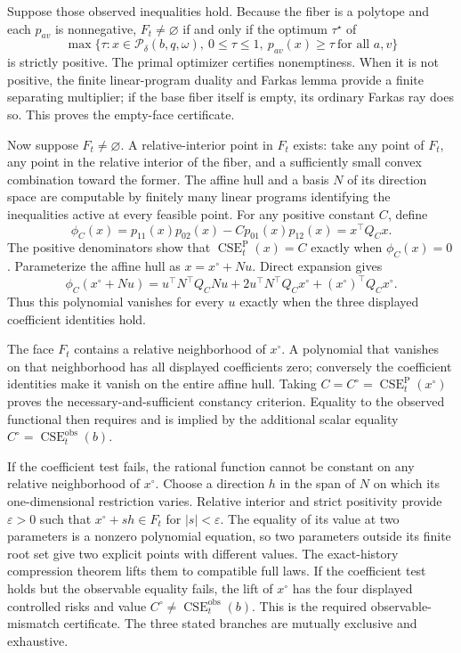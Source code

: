 Suppose those observed inequalities hold.  Because the fiber is a polytope and each \(p_{av}\) is nonnegative, \(F_t\ne\varnothing\) if and only if the optimum \(\tau^\star\) of
\[
\max\{\tau:x\in\mathcal P_\delta(b,q,\omega),\ 0\leq\tau\leq1,
\ p_{av}(x)\geq\tau\ \text{for all }a,v\}
\]
is strictly positive.  The primal optimizer certifies nonemptiness.  When it is not positive, the finite linear-program duality and Farkas lemma provide a finite separating multiplier; if the base fiber itself is empty, its ordinary Farkas ray does so.  This proves the empty-face certificate.

Now suppose \(F_t\ne\varnothing\).  A relative-interior point in \(F_t\) exists: take any point of \(F_t\), any point in the relative interior of the fiber, and a sufficiently small convex combination toward the former.  The affine hull and a basis \(N\) of its direction space are computable by finitely many linear programs identifying the inequalities active at every feasible point.  For any positive constant \(C\), define
\[
\phi_C(x)=p_{11}(x)p_{02}(x)-Cp_{01}(x)p_{12}(x)=x^\top Q_Cx.
\]
The positive denominators show that \(\operatorname{CSE}^{\mathrm P}_t(x)=C\) exactly when \(\phi_C(x)=0\).  Parameterize the affine hull as \(x=x^\circ+Nu\).  Direct expansion gives
\[
\phi_C(x^\circ+Nu)
=u^\top N^\top Q_CN u+2u^\top N^\top Q_Cx^\circ
+(x^\circ)^\top Q_Cx^\circ.
\]
Thus this polynomial vanishes for every \(u\) exactly when the three displayed coefficient identities hold.

The face \(F_t\) contains a relative neighborhood of \(x^\circ\).  A polynomial that vanishes on that neighborhood has all displayed coefficients zero; conversely the coefficient identities make it vanish on the entire affine hull.  Taking \(C=C^\circ=\operatorname{CSE}^{\mathrm P}_t(x^\circ)\) proves the necessary-and-sufficient constancy criterion.  Equality to the observed functional then requires and is implied by the additional scalar equality \(C^\circ=\operatorname{CSE}^{\mathrm{obs}}_t(b)\).

If the coefficient test fails, the rational function cannot be constant on any relative neighborhood of \(x^\circ\).  Choose a direction \(h\) in the span of \(N\) on which its one-dimensional restriction varies.  Relative interior and strict positivity provide \(\varepsilon>0\) such that \(x^\circ+sh\in F_t\) for \(|s|<\varepsilon\).  The equality of its value at two parameters is a nonzero polynomial equation, so two parameters outside its finite root set give two explicit points with different values.  The exact-history compression theorem lifts them to compatible full laws.  If the coefficient test holds but the observable equality fails, the lift of \(x^\circ\) has the four displayed controlled risks and value \(C^\circ\ne\operatorname{CSE}^{\mathrm{obs}}_t(b)\).  This is the required observable-mismatch certificate.  The three stated branches are mutually exclusive and exhaustive.

